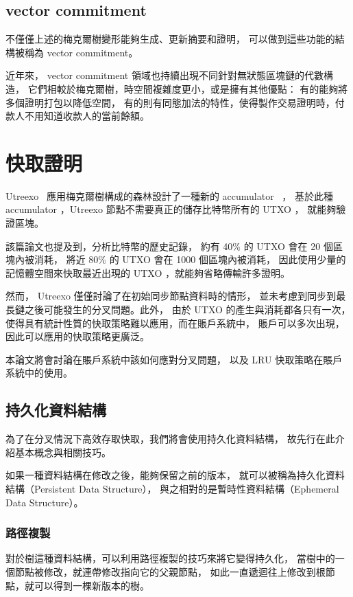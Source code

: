 \subsection{vector commitment}

不僅僅上述的梅克爾樹變形能夠生成、更新摘要和證明，
可以做到這些功能的結構被稱為 vector commitment\cite{catalano2013vector}。

近年來， vector commitment 領域也持續出現不同針對無狀態區塊鏈的代數構造，
它們相較於梅克爾樹，時空間複雜度更小，或是擁有其他優點：
有的能夠將多個證明打包以降低空間\cite{boneh2019batching}，
有的則有同態加法的特性，使得製作交易證明時，付款人不用知道收款人的當前餘額\cite{chepurnoy2018edrax}。

\section{快取證明}

Utreexo~\cite{dryja2019utreexo} 應用梅克爾樹構成的森林設計了一種新的 accumulator ~\cite{benaloh1993one}，
基於此種 accumulator ，Utreexo 節點不需要真正的儲存比特幣所有的 UTXO ，
就能夠驗證區塊。

該篇論文也提及到，分析比特幣的歷史記錄，
約有 40\% 的 UTXO 會在 20 個區塊內被消耗，
將近 80\% 的 UTXO 會在 1000 個區塊內被消耗，
因此使用少量的記憶體空間來快取最近出現的 UTXO ，就能夠省略傳輸許多證明。

然而， Utreexo 僅僅討論了在初始同步節點資料時的情形，
並未考慮到同步到最長鏈之後可能發生的分叉問題。此外，
由於 UTXO 的產生與消耗都各只有一次，
使得具有統計性質的快取策略難以應用，而在賬戶系統中，
賬戶可以多次出現，因此可以應用的快取策略更廣泛。

本論文將會討論在賬戶系統中該如何應對分叉問題，
以及 LRU 快取策略在賬戶系統中的使用。

\subsection{持久化資料結構}

為了在分叉情況下高效存取快取，我們將會使用持久化資料結構，
故先行在此介紹基本概念與相關技巧。

如果一種資料結構在修改之後，能夠保留之前的版本，
就可以被稱為持久化資料結構\cite{driscoll1986making}（Persistent Data Structure），
與之相對的是暫時性資料結構（Ephemeral Data Structure）。

\subsubsection{路徑複製}
對於樹這種資料結構，可以利用路徑複製的技巧來將它變得持久化，
當樹中的一個節點被修改，就連帶修改指向它的父親節點，
如此一直遞迴往上修改到根節點，就可以得到一棵新版本的樹。

